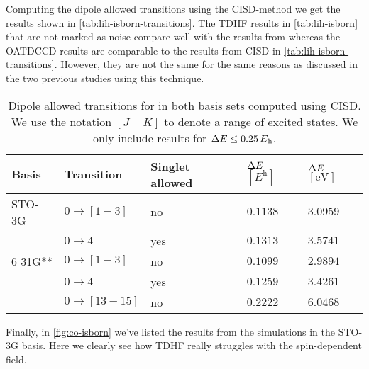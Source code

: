         Computing the dipole allowed transitions using the CISD-method we get
        the results shown in \autoref{tab:lih-isborn-transitions}.
        The TDHF results in \autoref{tab:lih-isborn} that are not marked as
        noise compare well with the results from \citeauthor{isborn}
        \cite{isborn} whereas the OATDCCD results are comparable to the results
        from CISD in \autoref{tab:lih-isborn-transitions}.
        However, they are not the same for the same reasons as discussed in the
        two previous studies using this technique.
        \begin{table}
            \centering
            \caption{Dipole allowed transitions for  in both basis sets
            computed using CISD.
            We use the notation $[J - K]$ to denote a range of excited states.
            We only include results for $\Delta \energy \leq
            \SI{0.25}{\hartree}$.}
            \begin{tabular}{@{}lllll@{}}
                \toprule
                Basis & Transition & Singlet allowed
                & $\Delta E$ $[\si{\hartree}]$
                & $\Delta E$ $[\si{\electronvolt}]$ \\
                \midrule
                STO-3G & $0 \to [1-3]$ & no & $0.1138$ & $3.0959$ \\
                & $0 \to 4$ & yes & $0.1313$ & $3.5741$ \\
                6-31G** & $0 \to [1-3]$ & no & $0.1099$ & $2.9894$ \\
                & $0 \to 4$ & yes & $0.1259$ & $3.4261$ \\
                & $0 \to [13-15]$ & no & $0.2222$ & $6.0468$ \\
                \bottomrule
            \end{tabular}
            \label{tab:lih-isborn-transitions}
        \end{table}
        Finally, in \autoref{fig:co-isborn} we've listed the results from the
         simulations in the STO-3G basis.
        Here we clearly see how TDHF really struggles with the spin-dependent
        field.
